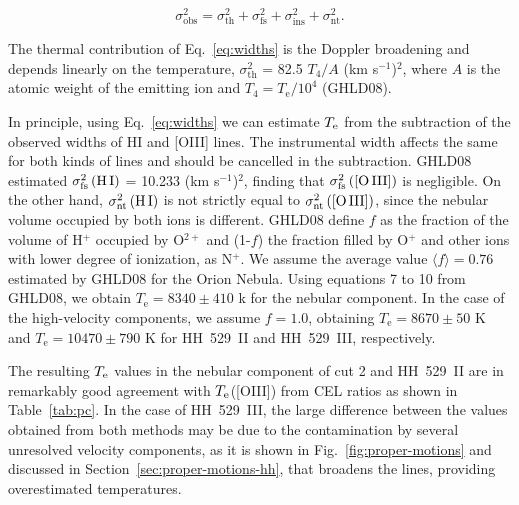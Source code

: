 \documentclass[fleqn,usenatbib]{mnras}
\begin{document}
\begin{equation}
    \label{eq:widths}
    \sigma_{\text{obs}}^{2}=\sigma_{\text{th}}^{2}+\sigma_{\text{fs}}^{2}+\sigma_{\text{ins}}^{2}+\sigma_{\text{nt}}^{2}.
\end{equation}{}

The thermal contribution of Eq.~\eqref{eq:widths} is the Doppler broadening and depends linearly on the temperature, $\sigma_{\text{th}}^{2}$ = 82.5 $T_4 /A$ (km s$^{-1}$)$^{2}$, where $A$ is the atomic weight of the emitting ion and $T_4 = T_{\text{e}}/10^{4}$ (GHLD08). 

In principle, using Eq.~\eqref{eq:widths} we can estimate $T_{\rm e}$ from the subtraction of the observed widths of \mbox{H}\thinspace \mbox{I} and \mbox{[O}\thinspace \mbox{III]} lines. The instrumental width affects the same for both kinds of lines and should be cancelled in the subtraction. GHLD08 estimated $\sigma_{\text{fs}}^{2}\left(\mbox{H}\thinspace \mbox{I}\right)$ = 10.233 (km s$^{-1}$)$^{2}$, finding that  $\sigma_{\text{fs}}^{2}\left(\mbox{[O}\thinspace \mbox{III]}\right)$ is negligible. On the other hand,  $\sigma_{\text{nt}}^{2}\left(\mbox{H}\thinspace \mbox{I}\right)$ is not strictly equal to $\sigma_{\text{nt}}^{2}\left(\mbox{[O}\thinspace \mbox{III]}\right)$, since the nebular volume occupied by both ions is different.  GHLD08 define $f$ as the fraction of the volume of H$^{+}$ occupied by O$^{2+}$ and (1-$f$) the fraction filled by O$^+$ and other ions with lower degree of ionization, as N$^{+}$. We assume the average value $\langle f \rangle=0.76$ estimated by GHLD08 for the Orion Nebula. Using equations 7 to 10 from GHLD08, we obtain  $T_{\text{e}} = 8340 \pm 410$ k for the nebular component. In the case of the high-velocity components, we assume $f=1.0$, obtaining $T_{\text{e}} = 8670 \pm 50$ K and $T_{\text{e}} = 10470 \pm 790$ K for HH~529~II and HH~529~III, respectively.

The resulting $T_{\rm e}$ values in the nebular component of cut 2 and HH~529~II are in remarkably good agreement with $T_{\rm e}$(\mbox{[O}\thinspace \mbox{III]}) from CEL ratios as shown in Table~\ref{tab:pc}. In the case of HH~529~III, the large difference between the values obtained from both methods may be due to the contamination by several unresolved velocity components, as it is shown in Fig.~\ref{fig:proper-motions} and discussed in Section~\ref{sec:proper-motions-hh}, that broadens the lines, providing overestimated temperatures.  
\end{document}
